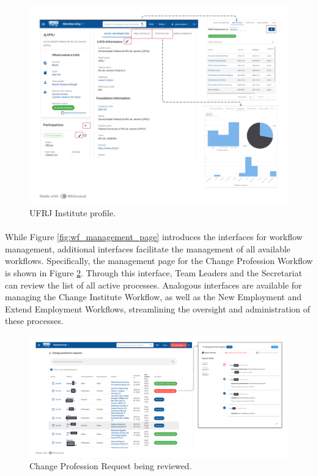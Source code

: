 \begin{figure} [H]
    \centering
    \includegraphics[width=1\linewidth]{figuras/mb_institute_profile.png}
    \caption{UFRJ Institute profile.}
    \label{fig:mb_institute_profile}
\end{figure}

\paragraph{} While Figure \ref{fig:wf_management_page} introduces the interfaces for workflow management, additional interfaces facilitate the management of all available workflows. Specifically, the management page for the Change Profession Workflow is shown in Figure \ref{fig:change_profession_wf}. Through this interface, Team Leaders and the Secretariat can review the list of all active processes. Analogous interfaces are available for managing the Change Institute Workflow, as well as the New Employment and Extend Employment Workflows, streamlining the oversight and administration of these processes.

\begin{figure} [H]
    \centering
    \includegraphics[width=1\linewidth]{figuras/change_profession_wf.png}
    \caption{Change Profession Request being reviewed.}
    \label{fig:change_profession_wf}
\end{figure}

